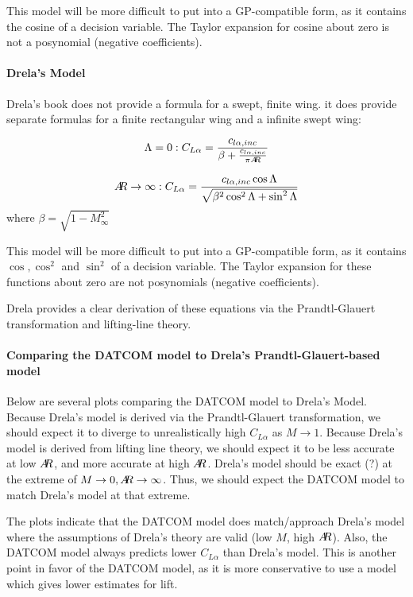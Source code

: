 \documentclass[12pt]{article}
\newcommand{\ar}{A\mkern-6mu R}
\begin{document}
This model will be more difficult to put into a GP-compatible form, as it contains the cosine of a decision variable. The Taylor expansion for cosine about zero is not a posynomial (negative coefficients).

\paragraph{Drela's Model}
Drela's book \cite{Drela2014} does not provide a formula for a swept, finite wing. it does provide separate formulas for a finite rectangular wing and a infinite swept wing:

\begin{equation}
\Lambda = 0: C_{L\alpha} = \frac{c_{l\alpha, inc}}{\beta + \frac{c_{l\alpha, inc}}{\pi \ar}}
\end{equation}

\begin{equation}
\ar \rightarrow \infty : C_{L\alpha} = \frac{c_{l\alpha, inc} \cos\Lambda}{
    \sqrt{\beta^2 \cos^2\Lambda + \sin^2\Lambda}}
\end{equation}
where $\beta = \sqrt{1 - M_\infty^2}$

This model will be more difficult to put into a GP-compatible form, as it contains $\cos, \cos^2$ and $\sin^2$ of a decision variable. The Taylor expansion for these functions about zero are not posynomials (negative coefficients).

Drela provides a clear derivation of these equations via the Prandtl-Glauert transformation and lifting-line theory. 


\paragraph{Comparing the DATCOM model to Drela's Prandtl-Glauert-based model}
Below are several plots comparing the DATCOM model to Drela's Model. Because Drela's model is derived via the Prandtl-Glauert transformation, we should expect it to diverge to unrealistically high $C_{L\alpha}$ as $M \rightarrow 1$. Because Drela's model is derived from lifting line theory, we should expect it to be less accurate at low $\ar$, and more accurate at high $\ar$.
Drela's model should be exact (?) at the extreme of $M \rightarrow 0, \ar \rightarrow \infty$. Thus, we should expect the DATCOM model to match Drela's model at that extreme.

The plots indicate that the DATCOM model does match/approach Drela's model where the assumptions of Drela's theory are valid (low $M$, high $\ar$). Also, the DATCOM model always predicts lower $C_{L\alpha}$ than Drela's model. This is another point in favor of the DATCOM model, as it is more conservative to use a model which gives lower estimates for lift.
\end{document}
